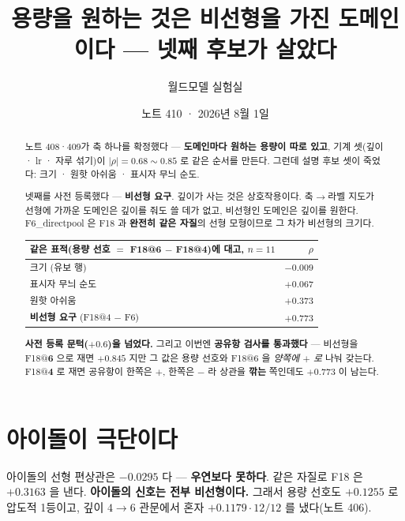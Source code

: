 \documentclass[11pt]{article}
\begin{document}
\title{용량을 원하는 것은 비선형을 가진 도메인이다 --- 넷째 후보가 살았다}
\author{월드모델 실험실}
\date{노트 410 · 2026년 8월 1일}
\maketitle

\begin{abstract}
노트 408·409가 축 하나를 확정했다 --- \textbf{도메인마다 원하는 용량이
따로 있고}, 기계 셋(깊이 · lr · 자루 섞기)이 $|\rho| = 0.68 \sim 0.85$ 로
같은 순서를 만든다. 그런데 설명 후보 셋이 죽었다: 크기 · 원핫 아쉬움 ·
표시자 무늬 순도.

넷째를 사전 등록했다 --- \textbf{비선형 요구}. 깊이가 사는 것은
상호작용이다. 축$\to$라벨 지도가 선형에 가까운 도메인은 깊이를 줘도 쓸 데가
없고, 비선형인 도메인은 깊이를 원한다. F6\_directpool 은 F18 과
\textbf{완전히 같은 자질}의 선형 모형이므로 그 차가 비선형의 크기다.

\begin{center}
\begin{tabular}{lr}
\hline
같은 표적(용량 선호 $=$ F18@6 $-$ F18@4)에 대고, $n{=}11$ & $\rho$ \\
\hline
크기 (유보 행) & $-0.009$ \\
표시자 무늬 순도 & $+0.067$ \\
원핫 아쉬움 & $+0.373$ \\
\textbf{비선형 요구} (F18@4 $-$ F6) & $\mathbf{+0.773}$ \\
\hline
\end{tabular}
\end{center}

\textbf{사전 등록 문턱($+0.6$)을 넘었다.} 그리고 이번엔
\textbf{공유항 검사를 통과했다} --- 비선형을 F18@\textbf{6} 으로 재면
$+0.845$ 지만 그 값은 용량 선호와 F18@6 을 \emph{양쪽에 $+$ 로} 나눠 갖는다.
F18@\textbf{4} 로 재면 공유항이 한쪽은 $+$, 한쪽은 $-$ 라 상관을
\textbf{깎는} 쪽인데도 $+0.773$ 이 남는다.
\end{abstract}

\section{아이돌이 극단이다}

아이돌의 선형 편상관은 $\mathbf{-0.0295}$ 다 --- \textbf{우연보다 못하다}.
같은 자질로 F18 은 $+0.3163$ 을 낸다. \textbf{아이돌의 신호는 전부
비선형이다.} 그래서 용량 선호도 $+0.1255$ 로 압도적 1등이고, 깊이 $4{\to}6$
관문에서 혼자 $+0.1179 \cdot 12/12$ 를 냈다(노트 406).
\end{document}

